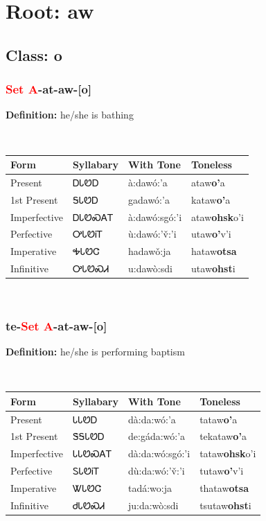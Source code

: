 \needspace{4in}
\section*{Root: aw}
\nopagebreak
{}
\needspace{3in}
\subsection*{Class: o}
\nopagebreak
\needspace{2in}
\subsubsection*{\textcolor{Red}{Set A}{-}at{-}\textbf{aw}{-}[o]}
\nopagebreak
\textbf{Definition: } he/she is bathing
\\[0.5em]
\begin{tabularx}{\textwidth}{l X X X}%
\toprule%
\textbf{Form}&\textbf{Syllabary}&\textbf{With Tone}&\textbf{Toneless}\\%
\midrule%
Present&ᎠᏓᏬᎠ&à:dawó:’a&ataw\textbf{o'}a\\%
1st Present&ᎦᏓᏬᎠ&gadawó:’a&kataw\textbf{o'}a\\%
Imperfective&ᎠᏓᏬᏍᎪᎢ&à:dawó:sgó:’i&ataw\textbf{ohsk}o'i\\%
Perfective&ᎤᏓᏬᎥᎢ&ù:dawó:’v̌:’i&utaw\textbf{o'}v'i\\%
Imperative&ᎭᏓᏬᏣ&hadawǒ:ja&hataw\textbf{otsa}\\%
Infinitive&ᎤᏓᏬᏍᏗ&u:dawò:sdi&utaw\textbf{ohst}i\\%
\bottomrule%
\end{tabularx}
\\[1em]
\needspace{2in}
\subsubsection*{te{-}\textcolor{Red}{Set A}{-}at{-}\textbf{aw}{-}[o]}
\nopagebreak
\textbf{Definition: } he/she is performing baptism
\\[0.5em]
\begin{tabularx}{\textwidth}{l X X X}%
\toprule%
\textbf{Form}&\textbf{Syllabary}&\textbf{With Tone}&\textbf{Toneless}\\%
\midrule%
Present&ᏓᏓᏬᎠ&dà:da:wó:’a&tataw\textbf{o'}a\\%
1st Present&ᏕᎦᏓᏬᎠ&de:gáda:wó:’a&tekataw\textbf{o'}a\\%
Imperfective&ᏓᏓᏬᏍᎪᎢ&dà:da:wó:sgó:’i&tataw\textbf{ohsk}o'i\\%
Perfective&ᏚᏓᏬᎥᎢ&dù:da:wó:’v̌:’i&tutaw\textbf{o'}v'i\\%
Imperative&ᏔᏓᏬᏣ&tadá:wo:ja&thataw\textbf{otsa}\\%
Infinitive&ᏧᏓᏬᏍᏗ&ju:da:wò:sdi&tsutaw\textbf{ohst}i\\%
\bottomrule%
\end{tabularx}
\\[1em]
\needspace{2in}
